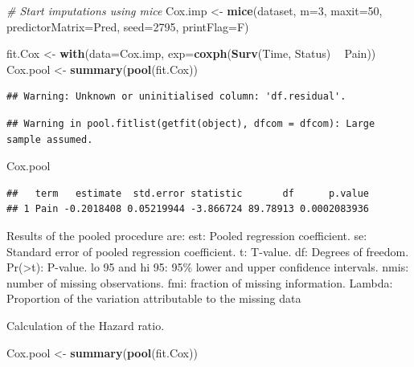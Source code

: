 \documentclass[
]{book}
\newenvironment{Shaded}{\begin{snugshade}}{\end{snugshade}}
\newcommand{\CommentTok}[1]{\textcolor[rgb]{0.56,0.35,0.01}{\textit{#1}}}
\newcommand{\DataTypeTok}[1]{\textcolor[rgb]{0.13,0.29,0.53}{#1}}
\newcommand{\DecValTok}[1]{\textcolor[rgb]{0.00,0.00,0.81}{#1}}
\newcommand{\KeywordTok}[1]{\textcolor[rgb]{0.13,0.29,0.53}{\textbf{#1}}}
\newcommand{\NormalTok}[1]{#1}
\newcommand{\OperatorTok}[1]{\textcolor[rgb]{0.81,0.36,0.00}{\textbf{#1}}}
\newcommand{\StringTok}[1]{\textcolor[rgb]{0.31,0.60,0.02}{#1}}
\begin{document}
\begin{Shaded}
\begin{Highlighting}[]
\CommentTok{# Start imputations using mice}
\NormalTok{Cox.imp <-}\StringTok{ }\KeywordTok{mice}\NormalTok{(dataset, }\DataTypeTok{m=}\DecValTok{3}\NormalTok{, }\DataTypeTok{maxit=}\DecValTok{50}\NormalTok{, }\DataTypeTok{predictorMatrix=}\NormalTok{Pred, }\DataTypeTok{seed=}\DecValTok{2795}\NormalTok{, }\DataTypeTok{printFlag=}\NormalTok{F)}

\NormalTok{fit.Cox <-}\StringTok{ }\KeywordTok{with}\NormalTok{(}\DataTypeTok{data=}\NormalTok{Cox.imp, }\DataTypeTok{exp=}\KeywordTok{coxph}\NormalTok{(}\KeywordTok{Surv}\NormalTok{(Time, Status) }\OperatorTok{~}\StringTok{ }\NormalTok{Pain))}
\NormalTok{Cox.pool <-}\StringTok{ }\KeywordTok{summary}\NormalTok{(}\KeywordTok{pool}\NormalTok{(fit.Cox))}
\end{Highlighting}
\end{Shaded}

\begin{verbatim}
## Warning: Unknown or uninitialised column: 'df.residual'.
\end{verbatim}

\begin{verbatim}
## Warning in pool.fitlist(getfit(object), dfcom = dfcom): Large sample assumed.
\end{verbatim}

\begin{Shaded}
\begin{Highlighting}[]
\NormalTok{Cox.pool}
\end{Highlighting}
\end{Shaded}

\begin{verbatim}
##   term   estimate  std.error statistic       df      p.value
## 1 Pain -0.2018408 0.05219944 -3.866724 89.78913 0.0002083936
\end{verbatim}

Results of the pooled procedure are:
est: Pooled regression coefficient.
se: Standard error of pooled regression coefficient.
t: T-value.
df: Degrees of freedom.
Pr(\textgreater\textbar t\textbar): P-value.
lo 95 and hi 95: 95\% lower and upper confidence intervals.
nmis: number of missing observations.
fmi: fraction of missing information.
Lambda: Proportion of the variation attributable to the missing data

Calculation of the Hazard ratio.

\begin{Shaded}
\begin{Highlighting}[]
\NormalTok{Cox.pool <-}\StringTok{ }\KeywordTok{summary}\NormalTok{(}\KeywordTok{pool}\NormalTok{(fit.Cox))}
\end{Highlighting}
\end{Shaded}
\end{document}

